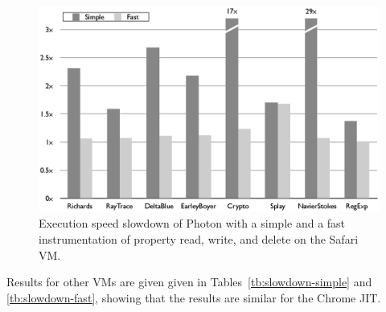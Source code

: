 \begin{figure}[htbp]
\begin{center}
\includegraphics[width=.85\textwidth]{figures/InstrumentationSlowdown}
\caption[Execution speed slowdown of Photon with an instrumentation]{Execution
speed slowdown of Photon with a simple and a fast instrumentation of property
read, write, and delete on the Safari VM.}
\label{fig:instr-slowdown}
\end{center}
\end{figure}


Results for other VMs are given  given in Tables~\ref{tb:slowdown-simple} and
\ref{tb:slowdown-fast}, showing that the results are similar for the Chrome
JIT. 


\FloatBarrier

